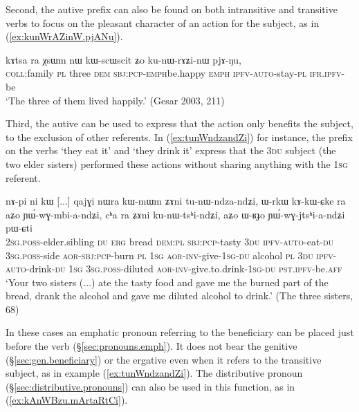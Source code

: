 Second, the autive prefix can also be found on both intransitive and transitive verbs to focus on the pleasant character of an action for the subject, as in (\ref{ex:kunWrAZinW.pjANu}).
 
\begin{exe}
\ex \label{ex:kunWrAZinW.pjANu}
\gll kɤtsa ra χsɯm nɯ kɯ-scɯ\redp{}scit ʑo ku-nɯ-rɤʑi-nɯ pjɤ-ŋu, \\
\textsc{coll}:family \textsc{pl} three \textsc{dem} \textsc{sbj}:\textsc{pcp}-\textsc{emph}\redp{}be.happy \textsc{emph} \textsc{ipfv}-\textsc{auto}-stay-\textsc{pl} \textsc{ifr}.\textsc{ipfv}-be \\
\glt `The three of them lived happily.' (Gesar 2003, 211)
\end{exe}

 
Third, the autive  can be used to express that the action only benefits the subject, to the exclusion of other referents. In (\ref{ex:tunWndzandZi}) for instance, the  prefix on the verbs  `they eat it' and  `they drink it' express that the \textsc{3du} subject (the two elder sisters) performed these actions without sharing anything with the \textsc{1sg} referent.

\begin{exe}
\ex \label{ex:tunWndzandZi}
\gll nɤ-pi ni kɯ [...] qajɣi nɯra kɯ-mɯm ʑɤni tu-nɯ-ndza-ndʑi, ɯ-rkɯ kɤ-kɯ-ɕke ra aʑo ɲɯ́-wɣ-mbi-a-ndʑi, cʰa ra ʑɤni ku-nɯ-tsʰi-ndʑi, aʑo ɯ-ʁɟo ɲɯ́-wɣ-jtsʰi-a-ndʑi pɯ-ɕti      \\
\textsc{2sg}.\textsc{poss}-elder.sibling \textsc{du} \textsc{erg} {  } bread \textsc{dem}:\textsc{pl} \textsc{sbj}:\textsc{pcp}-tasty  \textsc{3du} \textsc{ipfv}-\textsc{auto}-eat-\textsc{du} \textsc{3sg}.\textsc{poss}-side \textsc{aor}-\textsc{sbj}:\textsc{pcp}-burn \textsc{pl}  \textsc{1sg} \textsc{aor}-\textsc{inv}-give-\textsc{1sg}-\textsc{du} alcohol \textsc{pl} \textsc{3du} \textsc{ipfv}-\textsc{auto}-drink-\textsc{du} \textsc{1sg} \textsc{3sg}.\textsc{poss}-diluted \textsc{aor}-\textsc{inv}-give.to.drink-\textsc{1sg}-\textsc{du} \textsc{pst}.\textsc{ipfv}-be.\textsc{aff}  \\
 \glt `Your two sisters (...) ate the tasty food and gave me the burned part of the bread, drank the alcohol and gave me diluted alcohol to drink.'  (The three sisters, 68)
\end{exe} 

In these cases an emphatic pronoun referring to the beneficiary can be placed just before the verb (§\ref{sec:pronouns.emph}). It does not bear the genitive (§\ref{sec:gen.beneficiary}) or the ergative  even when it refers to the transitive subject, as  in example (\ref{ex:tunWndzandZi}).  The distributive pronoun  (§\ref{sec:distributive.pronouns}) can also be used in this function, as in (\ref{ex:kAnWBzu.mArtaRtCi}).

